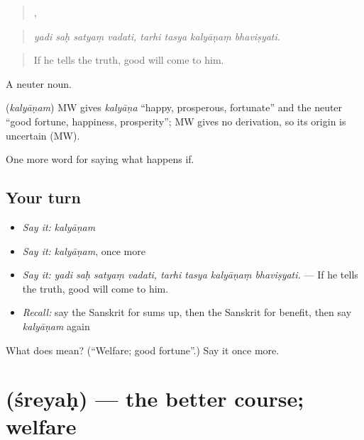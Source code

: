 \begin{quote}
   ,    
\end{quote}

\begin{quote}
\emph{yadi saḥ satyaṃ vadati, tarhi tasya kalyāṇaṃ bhaviṣyati.}
\end{quote}

\begin{quote}
If he tells the truth, good will come to him.
\end{quote}

A neuter noun.

\begin{cousinweb}
\textbf{} (\emph{kalyāṇam}) MW gives \emph{kalyāṇa} \textquotedblleft{}happy, prosperous, fortunate\textquotedblright{} and the neuter \textquotedblleft{}good fortune, happiness, prosperity\textquotedblright{}; MW gives no derivation, so its origin is uncertain (MW).
\end{cousinweb}

\begin{grammarlens}[title={What you've built}]
One more word for saying what happens if.
\end{grammarlens}

\subsection*{Your turn}
\begin{itemize}
\raggedright
  \item \emph{Say it:} \emph{kalyāṇam}
  \item \emph{Say it:} \emph{kalyāṇam}, once more
  \item \emph{Say it:} \emph{yadi saḥ satyaṃ vadati, tarhi tasya kalyāṇaṃ bhaviṣyati.} — If he tells the truth, good will come to him.
  \item \emph{Recall:} say the Sanskrit for sums up, then the Sanskrit for benefit, then say \emph{kalyāṇam} again
\end{itemize}

\begin{tcolorbox}[breakable,colback=teal!4,colframe=teal!35!black,title={Before you move on}]
What does  mean? (\textquotedblleft{}Welfare; good fortune\textquotedblright{}.) Say it once more.
\end{tcolorbox}
\section[\texorpdfstring{\sk{श्रेयः} (śreyaḥ)}{श्रेयः (śreyaḥ)}]{ (śreyaḥ) — the better course; welfare}

